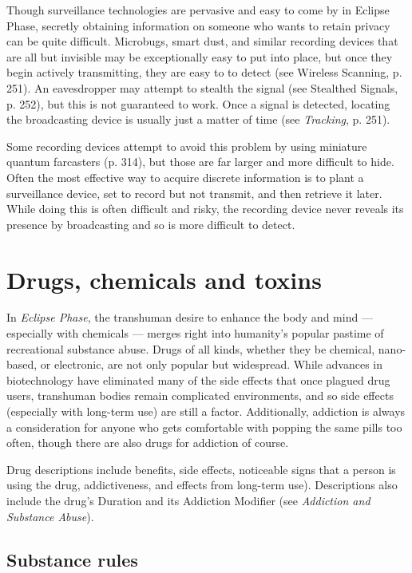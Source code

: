 Though surveillance technologies are pervasive and easy to come by in Eclipse Phase, secretly obtaining information on someone who wants to retain privacy can be quite difficult. Microbugs, smart dust, and similar recording devices that are all but invisible may be exceptionally easy to put into place, but once they begin actively transmitting, they are easy to to detect (see Wireless Scanning, p. 251). An eavesdropper may attempt to stealth the signal (see Stealthed Signals, p. 252), but this is not guaranteed to work. Once a signal is detected, locating the broadcasting device is usually just a matter of time (see \textit{Tracking}, p. 251).

Some recording devices attempt to avoid this problem by using miniature quantum farcasters (p. 314), but those are far larger and more difficult to hide. Often the most effective way to acquire discrete information is to plant a surveillance device, set to record but not transmit, and then retrieve it later. While doing this is often difficult and risky, the recording device never reveals its presence by broadcasting and so is more difficult to detect.

\section{Drugs, chemicals and toxins}
\label{sec:drugs-chemicals-toxins}

In \emph{Eclipse Phase}, the transhuman desire to enhance the body and mind --- especially with chemicals ---  merges right into humanity’s popular pastime of recreational substance abuse. Drugs of all kinds, whether they be chemical, nano-based, or electronic, are not only popular but widespread. While advances in biotechnology have eliminated many of the side effects that once plagued drug users, transhuman bodies remain complicated environments, and so side effects (especially with long-term use) are still a factor. Additionally, addiction is always a consideration for anyone who gets comfortable with popping the same pills too often, though there are also drugs for addiction of course.

Drug descriptions include benefits, side effects, noticeable signs that a person is using the drug, addictiveness, and effects from long-term use). Descriptions also include the drug’s Duration and its Addiction Modifier (see \emph{Addiction and Substance Abuse}).

\subsection{Substance rules}
\label{sec:substance-rules}

